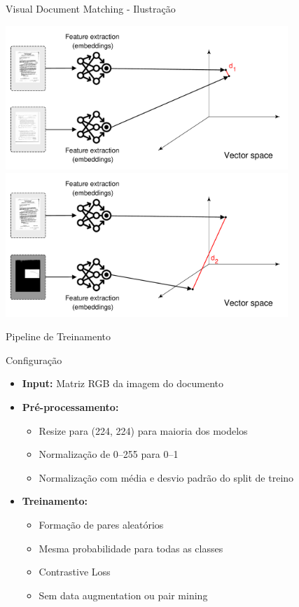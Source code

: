 \begin{frame}{Visual Document Matching - Ilustração}
\begin{center}
\includegraphics[width=0.8\textwidth]{images/vector_space_1.pdf}
\vspace{0.3cm}
\includegraphics[width=0.8\textwidth]{images/vector_space_2.pdf}
\end{center}
\end{frame}

\begin{frame}{Pipeline de Treinamento}
\begin{block}{Configuração}
\begin{itemize}
    \item \textbf{Input:} Matriz RGB da imagem do documento
    \item \textbf{Pré-processamento:}
    \begin{itemize}
        \item Resize para (224, 224) para maioria dos modelos
        \item Normalização de 0--255 para 0--1
        \item Normalização com média e desvio padrão do split de treino
    \end{itemize}
    \item \textbf{Treinamento:}
    \begin{itemize}
        \item Formação de pares aleatórios
        \item Mesma probabilidade para todas as classes
        \item Contrastive Loss
        \item Sem data augmentation ou pair mining
    \end{itemize}
\end{itemize}
\end{block}
\end{frame}

